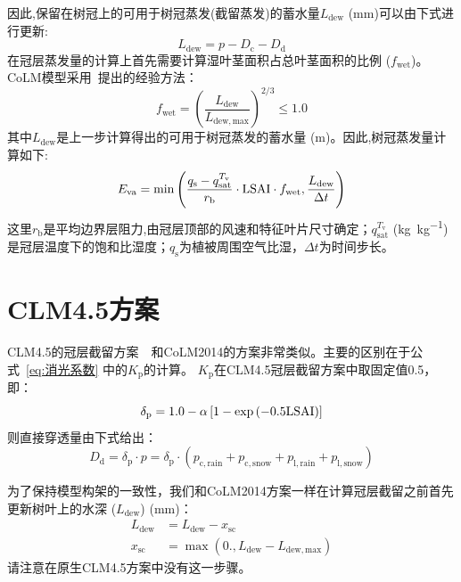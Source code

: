 因此,保留在树冠上的可用于树冠蒸发(截留蒸发)的蓄水量$L_{\mathrm{dew}}$ (mm)可以由下式进行更新:
\begin{equation}
  L_{\mathrm{dew}}={p}-D_{\mathrm{c}}-D_{\mathrm{d}}
\end{equation}
在冠层蒸发量的计算上首先需要计算湿叶茎面积占总叶茎面积的比例 ($f_{\mathrm{wet}}$)。CoLM模型采用~\citet{dickinson1993biosphere}提出的经验方法：
\begin{equation}
  f_{\mathrm{wet}}=\left(\frac{L_{\mathrm{dew}}}{L_{\mathrm{dew,max}}}\right)^{2 / 3} \leqslant 1.0
\end{equation}
其中$L_{\mathrm{dew}}$是上一步计算得出的可用于树冠蒸发的蓄水量 (m)。因此,树冠蒸发量计算如下:
\begin{equation}
  E_{\mathrm{va}} =\min \left(\frac{q_{\mathrm{s}}-q_{\mathrm{sat}}^{T_{\mathrm{v}}}}{r_{\mathrm{b}}}\cdot{\rm LSAI}\cdot f_{\mathrm{wet}}, \frac{L_{\mathrm{dew}}}{\Delta t}\right)
\end{equation}
这里$r_{\mathrm {b}} $是平均边界层阻力,由冠层顶部的风速和特征叶片尺寸确定；$q_{\mathrm{sat}}^{T_{\mathrm {v}} }$ (\unit{kg.kg^{-1}})是冠层温度下的饱和比湿度；$q_{\mathrm {s}} $为植被周围空气比湿，$\Delta t$为时间步长。


\section{CLM4.5方案}
CLM4.5的冠层截留方案~\citep{oleson2013technical}~和CoLM2014的方案非常类似。主要的区别在于公式~\eqref{eq:消光系数} 中的$K_{\mathrm {p}} $的计算。
$K_{\mathrm {p}} $在CLM4.5冠层截留方案中取固定值0.5，即：
%
\begin{equation}
  \delta_{\mathrm{p}}=1.0-\alpha \left[1-\exp \left(-0.5  {\rm LSAI}\right)\right]
\end{equation}
则直接穿透量由下式给出：
\begin{equation}
  D_{\mathrm{d}}=\delta_{\mathrm{p}} \cdot p=\delta_{\mathrm{p}} \cdot\left(p_{\mathrm{c,rain}}+p_{\mathrm{c,snow}}+p_{\mathrm{l,rain}}+p_{\mathrm{l,snow}}\right)
\end{equation}

为了保持模型构架的一致性，我们和CoLM2014方案一样在计算冠层截留之前首先更新树叶上的水深 ($L_{\mathrm{dew}}$) (mm)：
\begin{equation}
  \begin{aligned}
    L_{\mathrm{dew}} &= L_{\mathrm{dew}}-x_{\mathrm{sc}} \\
    x_{\mathrm{s c}} &= \max \left(0., L_{\mathrm{dew}}-L_{\mathrm{dew,max}}\right)
  \end{aligned}
\end{equation}
请注意在原生CLM4.5方案中没有这一步骤。

